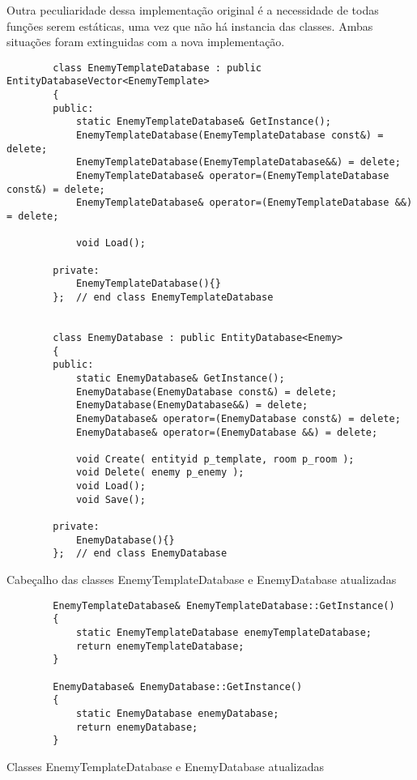 Outra peculiaridade dessa implementação original é a necessidade de todas funções serem estáticas, uma vez que 
não há instancia das classes. Ambas situações foram extinguidas com a nova implementação.

\begin{listing}[!ht]
    \begin{verbatim}
        class EnemyTemplateDatabase : public EntityDatabaseVector<EnemyTemplate>
        {
        public:
            static EnemyTemplateDatabase& GetInstance();
            EnemyTemplateDatabase(EnemyTemplateDatabase const&) = delete;
            EnemyTemplateDatabase(EnemyTemplateDatabase&&) = delete;
            EnemyTemplateDatabase& operator=(EnemyTemplateDatabase const&) = delete;
            EnemyTemplateDatabase& operator=(EnemyTemplateDatabase &&) = delete;

            void Load();

        private:
            EnemyTemplateDatabase(){}
        };  // end class EnemyTemplateDatabase


        class EnemyDatabase : public EntityDatabase<Enemy>
        {
        public:
            static EnemyDatabase& GetInstance();
            EnemyDatabase(EnemyDatabase const&) = delete;
            EnemyDatabase(EnemyDatabase&&) = delete;
            EnemyDatabase& operator=(EnemyDatabase const&) = delete;
            EnemyDatabase& operator=(EnemyDatabase &&) = delete;

            void Create( entityid p_template, room p_room );
            void Delete( enemy p_enemy );
            void Load();
            void Save();

        private:
            EnemyDatabase(){}
        };  // end class EnemyDatabase
    \end{verbatim}
\caption{Cabeçalho das classes EnemyTemplateDatabase e EnemyDatabase atualizadas}
\label{lst:enemyDatabaseHeaderUpdate}
\end{listing}

\begin{listing}[!ht]
    \begin{verbatim}
        EnemyTemplateDatabase& EnemyTemplateDatabase::GetInstance()
        {
            static EnemyTemplateDatabase enemyTemplateDatabase;
            return enemyTemplateDatabase;
        }

        EnemyDatabase& EnemyDatabase::GetInstance()
        {
            static EnemyDatabase enemyDatabase;
            return enemyDatabase;
        }
    \end{verbatim}
\caption{Classes EnemyTemplateDatabase e EnemyDatabase atualizadas}
\label{lst:enemyDatabaseUpdate}
\end{listing}

